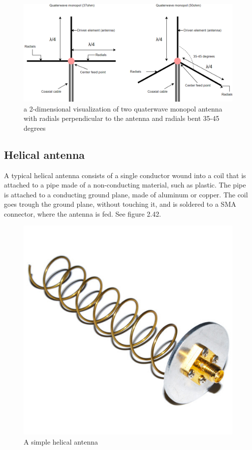 \begin{figure}[h]
\hspace{-1cm}
\includegraphics[scale=0.55]{figures/QuaterWaveMonopolAntennaRadials.PNG}
\caption{a 2-dimensional visualization of two quaterwave monopol antenna with radials perpendicular to the antenna and radials bent 35-45 degrees}
\end{figure}

\subsection{Helical antenna}
A typical helical antenna consists of a single conductor wound into a coil that is attached to a pipe made of a non-conducting material, such as plastic. The pipe is attached to a conducting ground plane, made of aluminum or copper. The coil goes trough the ground plane, without touching it, and is soldered to a SMA connector, where the antenna is fed. See figure 2.42. 

\begin{figure}[h]
\centering
\includegraphics[scale=0.6]{figures/HelixAntenna.jpg}
\caption{A simple helical antenna\cite{HelicalAntenna}}
\end{figure}

